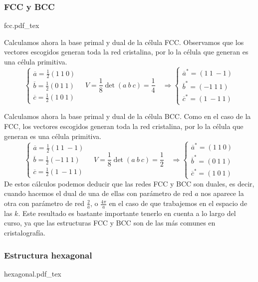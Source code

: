 \documentclass[leqno]{article}
\newcommand{\incfig}[1]{%
\center
\def\svgwidth{0.9\columnwidth}
{#1.pdf_tex}
}
\begin{document}
\subsubsection{FCC y BCC}
\begin{minipage}{0.9\textwidth}
\incfig{fcc}
\end{minipage}

Calculamos ahora la base primal y dual de la célula FCC. Observamos que los vectores escogidos generan toda la red cristalina, por lo la célula que generan es una célula primitiva.
\[
\begin{cases}
  \overline{a} = \frac{1}{2} (1\ 1\ 0) \\
  \overline{b} = \frac{1}{2} (0\ 1\ 1) \\
  \overline{c} = \frac{1}{2} (1\ 0\ 1)
\end{cases} \quad 
V = \frac{1}{8}\det(a\ b\ c) = \frac{1}{4} \quad \Rightarrow
\begin{cases}
  \overline{a}^* = (1\ 1\ -1)\\
  \overline{b}^* = (-1\ 1\ 1 )\\
  \overline{c}^* = (1\ -1\ 1)
\end{cases} 
\] 


Calculamos ahora la base primal y dual de la célula BCC. Como en el caso de la FCC, los vectores escogidos generan toda la red cristalina, por lo la célula que generan es una célula primitiva.
\[
\begin{cases}
  \overline{a} = \frac{1}{2} (1\ 1\ -1) \\
  \overline{b} = \frac{1}{2} (-1\ 1\ 1) \\
  \overline{c} = \frac{1}{2} (1\ -1\ 1)
\end{cases} \quad 
V = \frac{1}{8}\det(a\ b\ c) = \frac{1}{2} \quad \Rightarrow 
\begin{cases}
  \overline{a}^* = (1\ 1\ 0)\\
  \overline{b}^* = (0\ 1\ 1 )\\
  \overline{c}^* = (1\ 0\ 1)
\end{cases} 
\] 
De estos cálculos podemos deducir que las redes FCC y BCC son duales, es decir, cuando hacemos el dual de una de ellas con parámetro de red $a$ nos aparece la otra con parámetro de red  $\frac{2}{a}$, o $\frac{4\pi}{a}$ en el caso de que trabajemos en el espacio de las $k$. Este resultado es bastante importante tenerlo en cuenta a lo largo del curso, ya que las estructuras FCC y  BCC son de las más comunes en cristalografía.

\subsubsection{Estructura hexagonal}
\begin{minipage}{\textwidth}
  \incfig{hexagonal}
\end{minipage}
\end{document}
